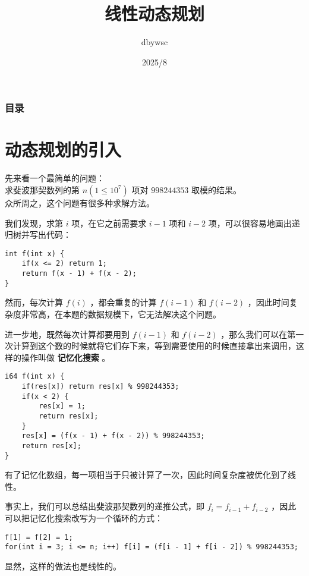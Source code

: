 \documentclass{beamer}
\title{线性动态规划}
\author{dbywsc}
\date{2025/8}
\newcommand{\fdf}[1]{\alert{\textbf{#1}}}
\begin{document}
\frame{\titlepage}
\begin{frame}
	\frametitle{目录}
	\tableofcontents
\end{frame}
\section{动态规划的引入}
\begin{frame}
先来看一个最简单的问题：\\ 
求斐波那契数列的第 $n(1 \leq 10^7)$ 项对 $998244353$ 取模的结果。\\ 
众所周之，这个问题有很多种求解方法。\\ 
\end{frame}
\begin{frame}[fragile]
我们发现，求第 $i$ 项，在它之前需要求	 $i - 1$ 项和 $i - 2$ 项，可以很容易地画出递归树并写出代码：
\begin{onlyenv}
\begin{verbatim}
int f(int x) {
    if(x <= 2) return 1;
    return f(x - 1) + f(x - 2);
}
\end{verbatim}
\end{onlyenv}
然而，每次计算 $f(i)$ ，都会重复的计算 $f(i - 1)$ 和 $f(i - 2)$ ，因此时间复杂度非常高，在本题的数据规模下，它无法解决这个问题。
\end{frame}
\begin{frame}[fragile]
进一步地，既然每次计算都要用到 $f(i - 1)$ 和 $f(i - 2)$ ，那么我们可以在第一次计算到这个数的时候就将它们存下来，等到需要使用的时候直接拿出来调用，这样的操作叫做 \fdf{记忆化搜索} 。
\begin{onlyenv}
\begin{verbatim}
i64 f(int x) {
    if(res[x]) return res[x] % 998244353;
    if(x < 2) {
        res[x] = 1;
        return res[x];
    }
    res[x] = (f(x - 1) + f(x - 2)) % 998244353;
    return res[x];
}
\end{verbatim}
\end{onlyenv}
有了记忆化数组，每一项相当于只被计算了一次，因此时间复杂度被优化到了线性。
\end{frame}
\begin{frame}[fragile]
事实上，我们可以总结出斐波那契数列的递推公式，即 $f_i = f_{i - 1} + f_{i - 2}$ ，因此可以把记忆化搜索改写为一个循环的方式：
\begin{onlyenv}
\begin{verbatim}
f[1] = f[2] = 1;
for(int i = 3; i <= n; i++) f[i] = (f[i - 1] + f[i - 2]) % 998244353;
\end{verbatim}
\end{onlyenv}
显然，这样的做法也是线性的。
\end{frame}
\end{document}
